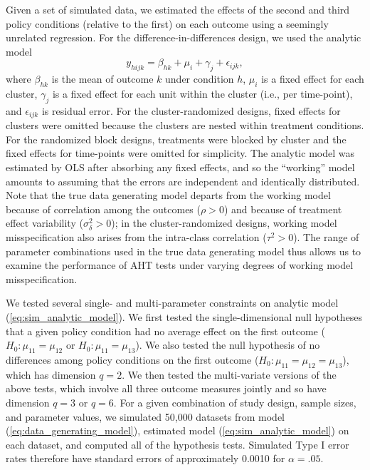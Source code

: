 \documentclass[12pt]{article}
\begin{document}
Given a set of simulated data, we estimated the effects of the second
and third policy conditions (relative to the first) on each outcome
using a seemingly unrelated regression. For the
difference-in-differences design, we used the analytic model
\begin{equation}
\label{eq:sim_analytic_model}
y_{hijk} = \beta_{hk} + \mu_i + \gamma_j + \epsilon_{ijk},
\end{equation} where \(\beta_{hk}\) is the mean of outcome \(k\) under
condition \(h\), \(\mu_i\) is a fixed effect for each cluster,
\(\gamma_j\) is a fixed effect for each unit within the cluster (i.e.,
per time-point), and \(\epsilon_{ijk}\) is residual error. For the
cluster-randomized designs, fixed effects for clusters were omitted
because the clusters are nested within treatment conditions. For the
randomized block designs, treatments were blocked by cluster and the
fixed effects for time-points were omitted for simplicity. The analytic
model was estimated by OLS after absorbing any fixed effects, and so the
``working'' model amounts to assuming that the errors are independent
and identically distributed. Note that the true data generating model
departs from the working model because of correlation among the outcomes
(\(\rho > 0\)) and because of treatment effect variability
(\(\sigma_\delta^2 > 0\)); in the cluster-randomized designs, working
model misspecification also arises from the intra-class correlation
(\(\tau^2 > 0\)). The range of parameter combinations used in the true
data generating model thus allows us to examine the performance of AHT
tests under varying degrees of working model misspecification.

We tested several single- and multi-parameter constraints on analytic
model (\ref{eq:sim_analytic_model}). We first tested the
single-dimensional null hypotheses that a given policy condition had no
average effect on the first outcome (\(H_0: \mu_{11} = \mu_{12}\) or
\(H_0: \mu_{11} = \mu_{13}\)). We also tested the null hypothesis of no
differences among policy conditions on the first outcome
(\(H_0: \mu_{11} = \mu_{12} = \mu_{13}\)), which has dimension
\(q = 2\). We then tested the multi-variate versions of the above tests,
which involve all three outcome measures jointly and so have dimension
\(q = 3\) or \(q = 6\). For a given combination of study design, sample
sizes, and parameter values, we simulated 50,000 datasets from model
(\ref{eq:data_generating_model}), estimated model
(\ref{eq:sim_analytic_model}) on each dataset, and computed all of the
hypothesis tests. Simulated Type I error rates therefore have standard
errors of approximately 0.0010 for \(\alpha = .05\).
\end{document}
